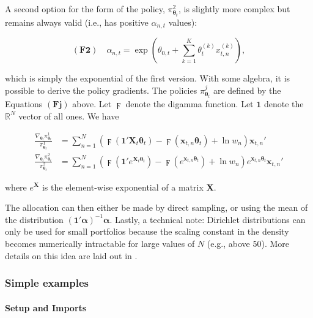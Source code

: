 A second option for the form of the policy, $\pi^2_{\boldsymbol{\theta}_t}$, is slightly more complex but remains always valid (i.e., has positive $\alpha_{n,t}$ values):

\begin{equation}
(\textbf{F2}) \quad  \alpha_{n,t}=\exp \left(\theta_{0,t} + \sum_{k=1}^K \theta_{t}^{(k)}x_{t,n}^{(k)}\right),
\end{equation}

which is simply the exponential of the first version. With some algebra, it is possible to derive the policy gradients. The policies $\pi^j_{\boldsymbol{\theta}_t}$ are defined by the Equations $(\textbf{Fj})$ above. Let $\digamma$ denote the digamma function. Let $\textbf{1}$ denote the $\mathbb{R}^N$ vector of all ones. We have

\begin{equation}
\begin{aligned}
\frac{\nabla_{\boldsymbol{\theta}_t} \pi^1_{\boldsymbol{\theta}_t}}{\pi^1_{\boldsymbol{\theta}_t}}&= \sum_{n=1}^N \left( \digamma \left( \textbf{1}'\textbf{X}_t\boldsymbol{\theta}_t \right) - \digamma(\textbf{x}_{t,n}\boldsymbol{\theta}_t) + \ln w_n \right) \textbf{x}_{t,n}' \\
\frac{\nabla_{\boldsymbol{\theta}_t} \pi^2_{\boldsymbol{\theta}_t}}{\pi^2_{\boldsymbol{\theta}_t}}&= \sum_{n=1}^N \left( \digamma \left( \textbf{1}'e^{\textbf{X}_{t}\boldsymbol{\theta}_t} \right) - \digamma(e^{\textbf{x}_{t,n}\boldsymbol{\theta}_t}) + \ln w_n \right) e^{\textbf{x}_{t,n}\boldsymbol{\theta}_t} \textbf{x}_{t,n}' 
\end{aligned}
\end{equation}

where $e^{\textbf{X}}$ is the element-wise exponential of a matrix $\textbf{X}$.

The allocation can then either be made by direct sampling, or using the mean of the distribution $(\textbf{1}'\boldsymbol{\alpha})^{ -1}\boldsymbol{\alpha}$. Lastly, a technical note: Dirichlet distributions can only be used for small portfolios because the scaling constant in the density becomes numerically intractable for large values of $N$ (e.g., above 50). More details on this idea are laid out in \cite{andre2020dirichlet}.

\subsubsection{Simple examples}

\paragraph{Setup and Imports}

